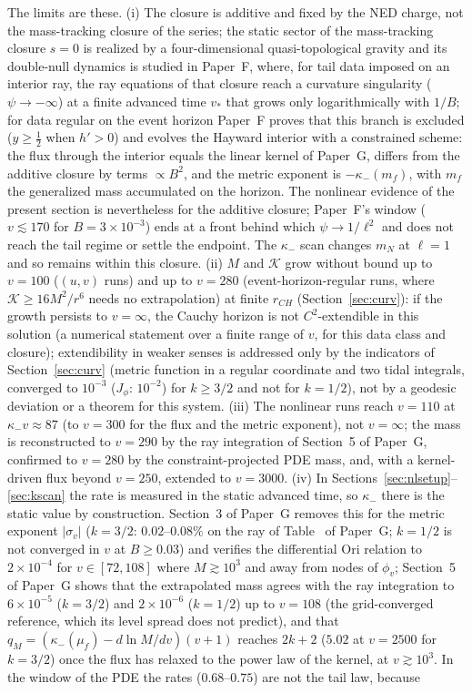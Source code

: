 \documentclass[11pt]{article}
\newcommand{\Gehdatan}{3}\newcommand{\Gkernelnum}{4}\newcommand{\Gshelln}{4.7}\newcommand{\Grayn}{5}
\begin{document}
The limits are these. (i) The closure is additive and fixed by the NED charge, not the mass-tracking closure of the series; the static sector of the mass-tracking closure $s=0$ is realized by a four-dimensional quasi-topological gravity \cite{BorissovaCarballoRubio2026,BuenoCanoHennigar2024} and its double-null dynamics is studied in Paper~F, where, for tail data imposed on an interior ray, the ray equations of that closure reach a curvature singularity ($\psi\to-\infty$) at a finite advanced time $v_*$ that grows only logarithmically with $1/B$; for data regular on the event horizon Paper~F proves that this branch is excluded ($y\ge\tfrac12$ when $h'>0$) and evolves the Hayward interior with a constrained scheme: the flux through the interior equals the linear kernel of Paper~G, differs from the additive closure by terms $\propto B^{2}$, and the metric exponent is $-\kappa_-(m_f)$, with $m_f$ the generalized mass accumulated on the horizon. The nonlinear evidence of the present section is nevertheless for the additive closure; Paper~F's window ($v\lesssim170$ for $B=3\times10^{-3}$) ends at a front behind which $\psi\to1/\ell^{2}$ and does not reach the tail regime or settle the endpoint. The $\kappa_-$ scan changes $m_N$ at $\ell=1$ and so remains within this closure. (ii) $M$ and $\mathcal K$ grow without bound up to $v=100$ ($(u,v)$ runs) and up to $v=280$ (event-horizon-regular runs, where $\mathcal K\ge16M^2/r^6$ needs no extrapolation) at finite $r_{CH}$ (Section~\ref{sec:curv}): if the growth persists to $v=\infty$, the Cauchy horizon is not $C^2$-extendible in this solution (a numerical statement over a finite range of $v$, for this data class and closure); extendibility in weaker senses is addressed only by the indicators of Section~\ref{sec:curv} (metric function in a regular coordinate and two tidal integrals, converged to $10^{-3}$ ($J_\phi$: $10^{-2}$) for $k\ge3/2$ and not for $k=1/2$), not by a geodesic deviation or a theorem for this system. (iii) The nonlinear runs reach $v=110$ at $\kappa_-v\approx87$ (to $v=300$ for the flux and the metric exponent), not $v=\infty$; the mass is reconstructed to $v=290$ by the ray integration of Section~\Grayn{} of Paper~G, confirmed to $v=280$ by the constraint-projected PDE mass, and, with a kernel-driven flux beyond $v=250$, extended to $v=3000$. (iv) In Sections~\ref{sec:nlsetup}--\ref{sec:kscan} the rate is measured in the static advanced time, so $\kappa_-$ there is the static value by construction. Section~\Gehdatan{} of Paper~G removes this for the metric exponent $|\sigma_v|$ ($k=3/2$: $0.02$--$0.08\%$ on the ray of Table~\Gtabeh{} of Paper~G; $k=1/2$ is not converged in $v$ at $B\ge0.03$) and verifies the differential Ori relation to $2\times10^{-4}$ for $v\in[72,108]$ where $M\gtrsim10^{3}$ and away from nodes of $\phi_v$; Section~\Grayn{} of Paper~G shows that the extrapolated mass agrees with the ray integration to $6\times10^{-5}$ ($k=3/2$) and $2\times10^{-6}$ ($k=1/2$) up to $v=108$ (the grid-converged reference, which its level spread does not predict), and that $q_M=(\kappa_-(\mu_f)-d\ln M/dv)(v+1)$ reaches $2k+2$ ($5.02$ at $v=2500$ for $k=3/2$) once the flux has relaxed to the power law of the kernel, at $v\gtrsim10^3$. In the window of the PDE the rates ($0.68$--$0.75$) are not the tail law, because 
\end{document}
